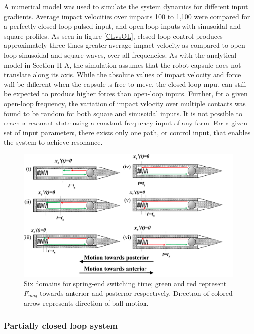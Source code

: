 \documentclass[letterpaper, 10 pt, conference]{ieeeconf}  %
\begin{document}
A numerical model was used to simulate the system dynamics for different input gradients. Average impact velocities over impacts 100 to 1,100 were compared for a perfectly closed loop pulsed input, and open loop inputs with sinusoidal and square profiles. As seen in figure \ref{CLvsOL}, closed loop control produces approximately three times greater average impact velocity as compared to open loop sinusoidal and square waves, over all frequencies. As with the analytical model in Section II-A, the simulation assumes that the robot capsule does not translate along its axis. While the absolute values of impact velocity and force will be different when the capsule is free to move, the closed-loop input can still be expected to produce higher forces than open-loop inputs. Further, for a given open-loop frequency, the variation of impact velocity over multiple contacts was found to be random for both square and sinusoidal inputs. It is not possible to reach a resonant state using a constant frequency input of any form. For a given set of input parameters, there exists only one path, or control input, that enables the system to achieve resonance. 
\begin{figure}
	\includegraphics[width=\linewidth]{Tswitchcases.pdf}
	\caption{Six domains for spring-end switching time; green and red represent $F_{mag}$ towards anterior and posterior respectively. Direction of colored arrow represents direction of ball motion.}
	\label{Tswitch}
	\vspace{-2em}
\end{figure}


\subsubsection{Partially closed loop system}
\label{pcl}
\end{document}
